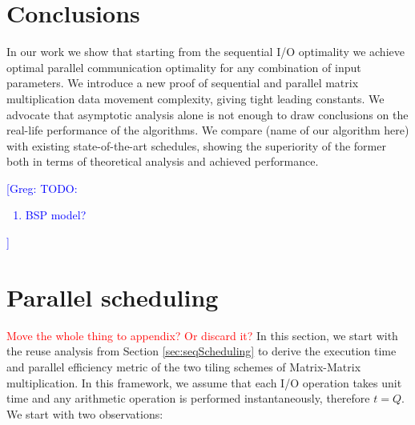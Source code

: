 \documentclass[sigplan,review,anonymous]{acmart}\settopmatter{printfolios=true,printccs=false,printacmref=false}
\newcommand\todo[1]{\textcolor{red}{#1}}
\newcommand\greg[1]{\textcolor{blue}{[Greg: #1]}}
\begin{document}
\section{Conclusions}
In our work we show that starting from the sequential I/O optimality we achieve 
optimal parallel communication optimality for any combination of input 
parameters. We introduce a new proof of sequential and parallel matrix 
multiplication data movement complexity, giving tight leading constants. We 
advocate that asymptotic analysis alone is not enough to draw conclusions on 
the real-life performance of the algorithms. We 
compare (name of our algorithm here) with existing state-of-the-art schedules, 
showing the 
superiority of the former both in terms of theoretical analysis and achieved 
performance.

\greg{
	TODO: 
	\begin{enumerate}
		\item BSP model?
	\end{enumerate}
}


%




\appendix
\section{Parallel scheduling}
\todo{Move the whole thing to appendix? Or discard it?}
In this section, we start with the reuse analysis from Section 
\ref{sec:seqScheduling} 
to derive the execution time and parallel efficiency metric of the two tiling 
schemes of Matrix-Matrix multiplication. In this framework, we assume that each 
I/O operation takes unit time and any arithmetic operation is performed 
instantaneously, therefore $t = Q$. We start with two observations:
\end{document}
